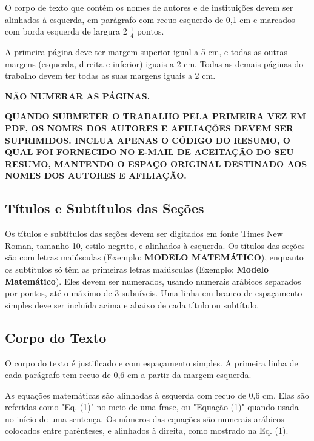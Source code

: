 \documentclass[10pt,fleqn,a4paper]{article}
\begin{document}
        O corpo de texto que contém os nomes de autores e de instituições devem ser alinhados à esquerda, em parágrafo com recuo esquerdo de 0,1 cm e marcados com borda esquerda de largura 2 $\frac{1}{4}$ pontos.

        A primeira página deve ter margem superior igual a 5 cm, e todas as outras margens (esquerda, direita e inferior) iguais a 2 cm. Todas as demais páginas do trabalho devem ter todas as suas margens iguais a 2 cm.

        \textbf{\textcolor[rgb]{0.98,0.00,0.00}{NÃO NUMERAR AS PÁGINAS.}}

        \textbf{\textcolor[rgb]{1.00,0.00,0.00}{QUANDO SUBMETER O TRABALHO PELA PRIMEIRA VEZ EM PDF, OS NOMES DOS AUTORES E AFILIAÇÕES DEVEM SER SUPRIMIDOS. INCLUA APENAS O CÓDIGO DO RESUMO, O QUAL FOI FORNECIDO NO E-MAIL DE ACEITAÇÃO DO SEU RESUMO, MANTENDO O ESPAÇO ORIGINAL DESTINADO AOS NOMES DOS AUTORES E AFILIAÇÃO.}}


    \subsection{Títulos e Subtítulos das Seções }

        Os títulos e subtítulos das seções devem ser digitados em fonte Times New Roman, tamanho 10, estilo negrito, e alinhados à esquerda. Os títulos das seções são com letras maiúsculas (Exemplo: \textbf{MODELO MATEMÁTICO}), enquanto os subtítulos só têm as primeiras letras maiúsculas (Exemplo: \textbf{Modelo Matemático}). Eles devem ser numerados, usando numerais arábicos separados por pontos, até o máximo de 3 subníveis. Uma linha em branco de espaçamento simples deve ser incluída acima e abaixo de cada título ou subtítulo.

    \subsection{Corpo do Texto}

        O corpo do texto é justificado e com espaçamento simples. A primeira linha de cada parágrafo tem recuo de 0,6 cm a partir da margem esquerda.

        As equações matemáticas são alinhadas à esquerda com recuo de 0,6 cm.  Elas são referidas como "Eq. (1)" no meio de uma frase, ou "Equação (1)" quando usada no início de uma sentença. Os números das equações são numerais arábicos colocados entre parênteses, e alinhados à direita, como mostrado na Eq. (1).
\end{document}

